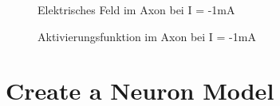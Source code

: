\documentclass[conference]{IEEEtran}
\begin{document}
\begin{enumerate}
\begin{figure}[h!]
  	\centering
    \scalebox{.6}{}
    \caption{Elektrisches Feld im Axon bei I = -1mA}
    \label{fig:E2}
\end{figure}

\begin{figure}[h!]
  	\centering
    \scalebox{.6}{}
    \caption{Aktivierungsfunktion im Axon bei I = -1mA}
    \label{fig:A2}
\end{figure}

\end{enumerate}

\section{Create a Neuron Model}
\end{document}
